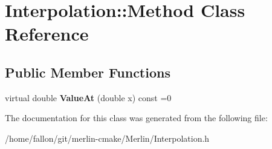 \hypertarget{classInterpolation_1_1Method}{}\section{Interpolation\+:\+:Method Class Reference}
\label{classInterpolation_1_1Method}
\subsection*{Public Member Functions}
\begin{DoxyCompactItemize}
\item 
\mbox{\label{classInterpolation_1_1Method_a068937a47a2bb8ca1ac5a73e0e7be442}} 
virtual double {\bfseries Value\+At} (double x) const =0
\end{DoxyCompactItemize}


The documentation for this class was generated from the following file\+:\begin{DoxyCompactItemize}
\item 
/home/fallon/git/merlin-\/cmake/\+Merlin/Interpolation.\+h\end{DoxyCompactItemize}
